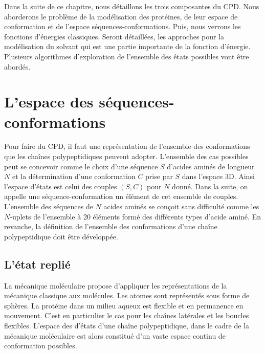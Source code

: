 Dans la suite de ce chapitre, nous détaillons les trois composantes du CPD. Nous aborderons le problème de la modélisation des protéines, de leur espace de conformation et de l'espace séquences-conformations. Puis, nous verrons les fonctions d'énergies classiques. Seront détaillées, les approches pour la modélisation du solvant qui est une partie importante de la fonction d'énergie. Plusieurs algorithmes d'exploration de l'ensemble des états possibles vont être abordés.  

\section{L'espace des séquences-conformations}
Pour faire du CPD, il faut une représentation de l'ensemble des conformations que les chaînes polypeptidiques peuvent adopter. L'ensemble des cas possibles peut se concevoir comme le choix d'une séquence $S$ d'acides aminés de longueur $N$ et la détermination d'une conformation $C$ prise par $S$ dans l'espace 3D. Ainsi l'espace d'états est celui des couples $(S,C)$ pour $N$ donné. Dans la suite, on appelle une séquence-conformation un élément de cet ensemble de couples. L'ensemble des séquences de $N$ acides aminés se conçoit sans difficulté comme les $N$-uplets de l'ensemble à $20$ éléments formé des différents types d'acide aminé. En revanche, la définition de l'ensemble des conformations d'une chaîne polypeptidique doit être développée.

\subsection{L'état replié }
\label{sec:etatreplie}
La mécanique moléculaire propose d'appliquer les représentations de la mécanique classique aux molécules. Les atomes sont représentés sous forme de sphères. La protéine dans un milieu aqueux est flexible et en permanence en mouvement. C'est en particulier le cas pour les chaînes latérales et les boucles flexibles. L'espace des d'états d'une chaîne polypeptidique, dans le cadre de la mécanique moléculaire est alors constitué d'un vaste espace continu de conformation possibles.

